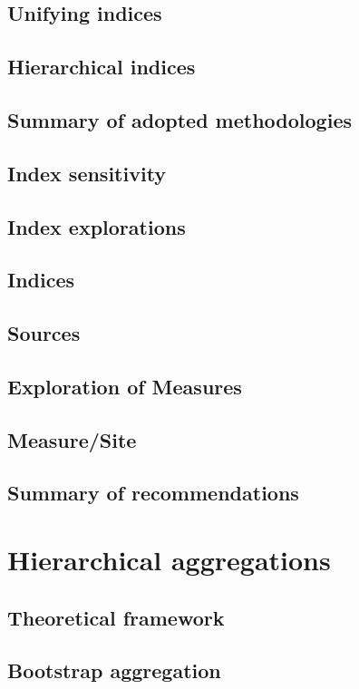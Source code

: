 \documentclass[a4paper]{AIMSreport}
\begin{document}
\subsection{Unifying indices}
\subsection{Hierarchical indices}
\subsection{Summary of adopted methodologies}
\subsection{Index sensitivity}
\subsection{Index explorations}
\subsection{Indices}

\subsection{Sources}
\subsection{Exploration of Measures}
\subsection{Measure/Site}
\subsection{Summary of recommendations}

\section{Hierarchical aggregations}
\subsection{Theoretical framework}
\subsection{Bootstrap aggregation}                   
\end{document}
